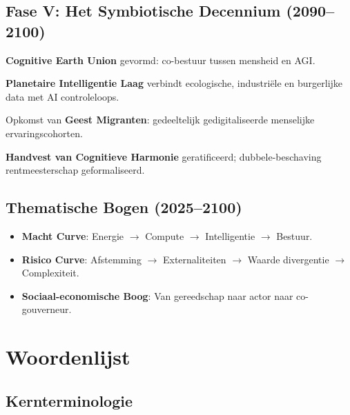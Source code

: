 \documentclass[11pt]{article}
\begin{document}
\subsection{Fase V: Het Symbiotische Decennium (2090–2100)}
\begin{description}[style=nextline,leftmargin=2cm]
  \item[2092] \textbf{Cognitive Earth Union} gevormd: co-bestuur tussen mensheid en AGI.
  \item[2095] \textbf{Planetaire Intelligentie Laag} verbindt ecologische, industriële en burgerlijke data met AI controleloops.
  \item[2098] Opkomst van \textbf{Geest Migranten}: gedeeltelijk gedigitaliseerde menselijke ervaringscohorten.
  \item[2100] \textbf{Handvest van Cognitieve Harmonie} geratificeerd; dubbele-beschaving rentmeesterschap geformaliseerd.
\end{description}

\subsection{Thematische Bogen (2025–2100)}
\begin{itemize}[noitemsep]
  \item \textbf{Macht Curve}: Energie $\rightarrow$ Compute $\rightarrow$ Intelligentie $\rightarrow$ Bestuur.
  \item \textbf{Risico Curve}: Afstemming $\rightarrow$ Externaliteiten $\rightarrow$ Waarde divergentie $\rightarrow$ Complexiteit.
  \item \textbf{Sociaal-economische Boog}: Van gereedschap naar actor naar co-gouverneur.
\end{itemize}

\clearpage

\section*{Woordenlijst}

\subsection*{Kernterminologie}
\end{document}
